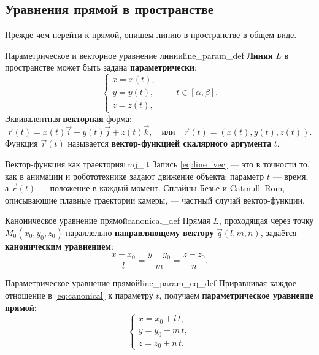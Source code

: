 \documentclass[12pt,a4paper]{article}
\begin{document}
\subsection*{Уравнения прямой в пространстве}

Прежде чем перейти к прямой, опишем линию в пространстве в общем виде.

\begin{definition}{Параметрическое и векторное уравнение линии}{line_param_def}
  \textbf{Линия} $L$ в пространстве может быть задана
  \textbf{параметрически}:
  \begin{equation}
    \begin{cases}
      x = x(t), \\ y = y(t), \\ z = z(t),
    \end{cases} \qquad t \in [\alpha, \beta].
    \tag{10.7}\label{eq:line_param}
  \end{equation}
  Эквивалентная \textbf{векторная} форма:
  \begin{equation}
    \vec{r}(t) = x(t)\vec{i} + y(t)\vec{j} + z(t)\vec{k}, \quad
    \text{или} \quad \vec{r}(t) = (x(t), y(t), z(t)).
    \tag{10.8}\label{eq:line_vec}
  \end{equation}
  Функция $\vec{r}(t)$ называется \textbf{вектор-функцией скалярного
  аргумента} $t$.
\end{definition}

\begin{remarkIT}{Вектор-функция как траектория}{traj_it}
  Запись \eqref{eq:line_vec} --- это в точности то, как в анимации и
  робототехнике задают движение объекта: параметр $t$ --- время, а
  $\vec{r}(t)$ --- положение в каждый момент. Сплайны Безье и
  Catmull--Rom, описывающие плавные траектории камеры, --- частный
  случай вектор-функции.
\end{remarkIT}

\begin{definition}{Каноническое уравнение прямой}{canonical_def}
  Прямая $L$, проходящая через точку $M_0(x_0,y_0,z_0)$ параллельно
  \textbf{направляющему вектору} $\vec{q}(l,m,n)$, задаётся
  \textbf{каноническим уравнением}:
  \begin{equation}
    \frac{x - x_0}{l} = \frac{y - y_0}{m} = \frac{z - z_0}{n}.
    \tag{10.9}\label{eq:canonical}
  \end{equation}
\end{definition}

\begin{definition}{Параметрическое уравнение прямой}{line_param_eq_def}
  Приравнивая каждое отношение в \eqref{eq:canonical} к параметру $t$,
  получаем \textbf{параметрическое уравнение прямой}:
  \begin{equation}
    \begin{cases}
      x = x_0 + l\,t, \\ y = y_0 + m\,t, \\ z = z_0 + n\,t.
    \end{cases}
    \tag{10.10}\label{eq:line_param_eq}
  \end{equation}
\end{definition}
\end{document}
